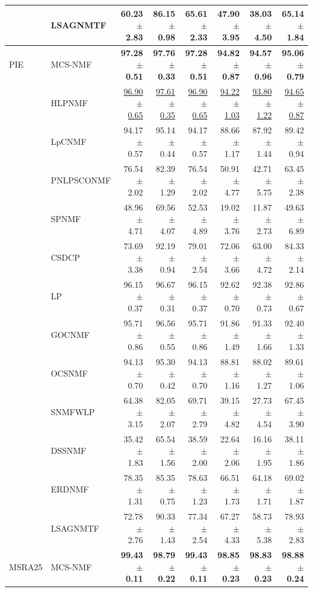 \begin{landscape}
\begin{longtable}{llrrrrrr}
 & LSAGNMTF & 60.23 $\pm$ 2.83 & 86.15 $\pm$ 0.98 & 65.61 $\pm$ 2.33 & 47.90 $\pm$ 3.95 & 38.03 $\pm$ 4.50 & 65.14 $\pm$ 1.84 \\
\midrule
PIE & MCS-NMF & \textbf{97.28 $\pm$ 0.51} & \textbf{97.76 $\pm$ 0.33} & \textbf{97.28 $\pm$ 0.51} & \textbf{94.82 $\pm$ 0.87} & \textbf{94.57 $\pm$ 0.96} & \textbf{95.06 $\pm$ 0.79} \\
 & HLPNMF & \underline{96.90 $\pm$ 0.65} & \underline{97.61 $\pm$ 0.35} & \underline{96.90 $\pm$ 0.65} & \underline{94.22 $\pm$ 1.03} & \underline{93.80 $\pm$ 1.22} & \underline{94.65 $\pm$ 0.87} \\
 & LpCNMF & 94.17 $\pm$ 0.57 & 95.14 $\pm$ 0.44 & 94.17 $\pm$ 0.57 & 88.66 $\pm$ 1.17 & 87.92 $\pm$ 1.44 & 89.42 $\pm$ 0.94 \\
 & PNLPSCONMF & 76.54 $\pm$ 2.02 & 82.39 $\pm$ 1.29 & 76.54 $\pm$ 2.02 & 50.91 $\pm$ 4.77 & 42.71 $\pm$ 5.75 & 63.45 $\pm$ 2.38 \\
 & SPNMF & 48.96 $\pm$ 4.71 & 69.56 $\pm$ 4.07 & 52.53 $\pm$ 4.89 & 19.02 $\pm$ 3.76 & 11.87 $\pm$ 2.73 & 49.63 $\pm$ 6.89 \\
 & CSDCP & 73.69 $\pm$ 3.38 & 92.19 $\pm$ 0.94 & 79.01 $\pm$ 2.54 & 72.06 $\pm$ 3.66 & 63.00 $\pm$ 4.72 & 84.33 $\pm$ 2.14 \\
 & LP & 96.15 $\pm$ 0.37 & 96.67 $\pm$ 0.31 & 96.15 $\pm$ 0.37 & 92.62 $\pm$ 0.70 & 92.38 $\pm$ 0.73 & 92.86 $\pm$ 0.67 \\
 & GOCNMF & 95.71 $\pm$ 0.86 & 96.56 $\pm$ 0.55 & 95.71 $\pm$ 0.86 & 91.86 $\pm$ 1.49 & 91.33 $\pm$ 1.66 & 92.40 $\pm$ 1.33 \\
 & OCSNMF & 94.13 $\pm$ 0.70 & 95.30 $\pm$ 0.42 & 94.13 $\pm$ 0.70 & 88.81 $\pm$ 1.16 & 88.02 $\pm$ 1.27 & 89.61 $\pm$ 1.06 \\
 & SNMFWLP & 64.38 $\pm$ 3.15 & 82.05 $\pm$ 2.07 & 69.71 $\pm$ 2.79 & 39.15 $\pm$ 4.82 & 27.73 $\pm$ 4.54 & 67.45 $\pm$ 3.90 \\
 & DSSNMF & 35.42 $\pm$ 1.83 & 65.54 $\pm$ 1.56 & 38.59 $\pm$ 2.00 & 22.64 $\pm$ 2.06 & 16.16 $\pm$ 1.95 & 38.11 $\pm$ 1.86 \\
 & ERDNMF & 78.35 $\pm$ 1.31 & 85.35 $\pm$ 0.75 & 78.63 $\pm$ 1.23 & 66.51 $\pm$ 1.73 & 64.18 $\pm$ 1.71 & 69.02 $\pm$ 1.87 \\
 & LSAGNMTF & 72.78 $\pm$ 2.76 & 90.33 $\pm$ 1.43 & 77.34 $\pm$ 2.54 & 67.27 $\pm$ 4.33 & 58.73 $\pm$ 5.38 & 78.93 $\pm$ 2.83 \\
\midrule
MSRA25 & MCS-NMF & \textbf{99.43 $\pm$ 0.11} & \textbf{98.79 $\pm$ 0.22} & \textbf{99.43 $\pm$ 0.11} & \textbf{98.85 $\pm$ 0.23} & \textbf{98.83 $\pm$ 0.23} & \textbf{98.88 $\pm$ 0.24} \\

\end{longtable}
\end{landscape}
